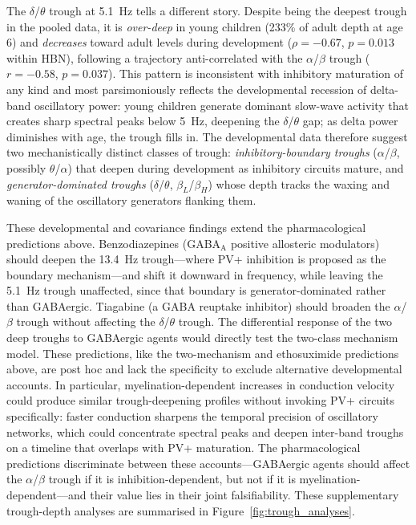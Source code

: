 The $\delta$/$\theta$ trough at 5.1~Hz tells a different story. Despite being the deepest trough in the pooled data, it is \emph{over-deep} in young children (233\% of adult depth at age 6) and \emph{decreases} toward adult levels during development ($\rho = -0.67$, $p = 0.013$ within HBN), following a trajectory anti-correlated with the $\alpha$/$\beta$ trough ($r = -0.58$, $p = 0.037$). This pattern is inconsistent with inhibitory maturation of any kind and most parsimoniously reflects the developmental recession of delta-band oscillatory power: young children generate dominant slow-wave activity that creates sharp spectral peaks below 5~Hz, deepening the $\delta$/$\theta$ gap; as delta power diminishes with age, the trough fills in. The developmental data therefore suggest two mechanistically distinct classes of trough: \emph{inhibitory-boundary troughs} ($\alpha$/$\beta$, possibly $\theta$/$\alpha$) that deepen during development as inhibitory circuits mature, and \emph{generator-dominated troughs} ($\delta$/$\theta$, $\beta_L$/$\beta_H$) whose depth tracks the waxing and waning of the oscillatory generators flanking them.

These developmental and covariance findings extend the pharmacological predictions above. Benzodiazepines (GABA$_\text{A}$ positive allosteric modulators) should deepen the 13.4~Hz trough---where PV+ inhibition is proposed as the boundary mechanism---and shift it downward in frequency, while leaving the 5.1~Hz trough unaffected, since that boundary is generator-dominated rather than GABAergic. Tiagabine (a GABA reuptake inhibitor) should broaden the $\alpha$/$\beta$ trough without affecting the $\delta$/$\theta$ trough. The differential response of the two deep troughs to GABAergic agents would directly test the two-class mechanism model. These predictions, like the two-mechanism and ethosuximide predictions above, are post hoc and lack the specificity to exclude alternative developmental accounts. In particular, myelination-dependent increases in conduction velocity could produce similar trough-deepening profiles without invoking PV+ circuits specifically: faster conduction sharpens the temporal precision of oscillatory networks, which could concentrate spectral peaks and deepen inter-band troughs on a timeline that overlaps with PV+ maturation. The pharmacological predictions discriminate between these accounts---GABAergic agents should affect the $\alpha$/$\beta$ trough if it is inhibition-dependent, but not if it is myelination-dependent---and their value lies in their joint falsifiability. These supplementary trough-depth analyses are summarised in Figure~\ref{fig:trough_analyses}.

